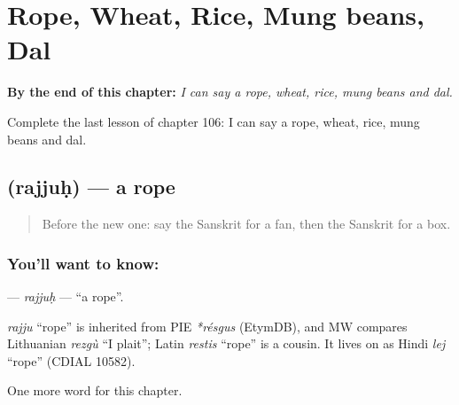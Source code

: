 
\chapter{Rope, Wheat, Rice, Mung beans, Dal}
\label{ch:sa-rope-wheat-rice-mung-beans-dal}

\begin{chapteropening}
\textbf{By the end of this chapter:} \emph{I can say a rope, wheat, rice, mung beans and dal.}

Complete the last lesson of chapter 106: I can say a rope, wheat, rice, mung beans and dal.
\end{chapteropening}

\section[\texorpdfstring{\sk{रज्जुः} (rajjuḥ)}{रज्जुः (rajjuḥ)}]{ (rajjuḥ) — a rope}

\label{lesson:SA-C106-rajjuh}



\begin{quote}
Before the new one: say the Sanskrit for a fan, then the Sanskrit for a box.
\end{quote}

\subsection*{You'll want to know: }
\textbf{} — \emph{rajjuḥ} — \textquotedblleft{}a rope\textquotedblright{}.

\begin{cousinweb}
\emph{rajju} \textquotedblleft{}rope\textquotedblright{} is inherited from PIE \emph{*résgus} (EtymDB), and MW compares Lithuanian \emph{rezgù} \textquotedblleft{}I plait\textquotedblright{}; Latin \emph{restis} \textquotedblleft{}rope\textquotedblright{} is a cousin. It lives on as Hindi \emph{lej} \textquotedblleft{}rope\textquotedblright{} (CDIAL 10582).
\end{cousinweb}

\begin{grammarlens}[title={What you've built}]
One more word for this chapter.
\end{grammarlens}

